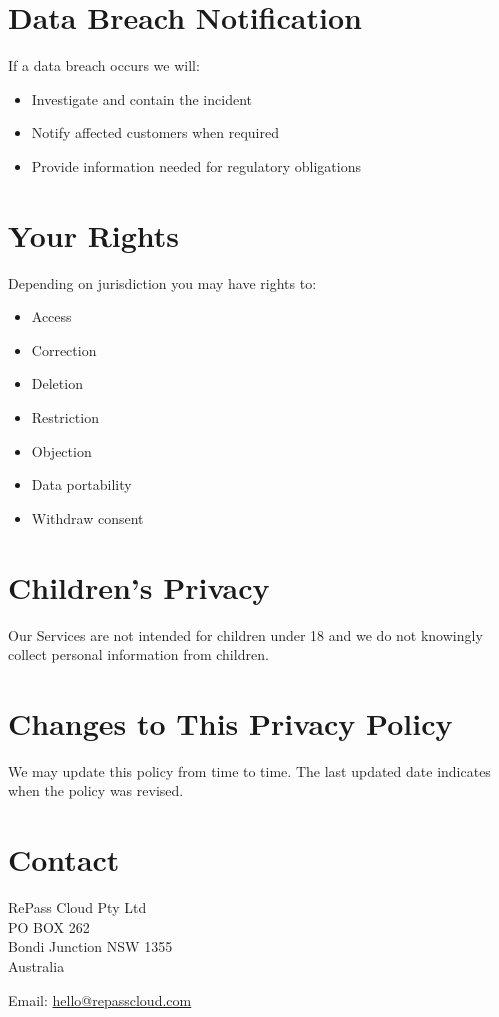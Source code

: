 \documentclass[11pt]{article}
\begin{document}
\section{Data Breach Notification}

If a data breach occurs we will:

\begin{itemize}
\item Investigate and contain the incident
\item Notify affected customers when required
\item Provide information needed for regulatory obligations
\end{itemize}

\section{Your Rights}

Depending on jurisdiction you may have rights to:

\begin{itemize}
\item Access
\item Correction
\item Deletion
\item Restriction
\item Objection
\item Data portability
\item Withdraw consent
\end{itemize}

\section{Children's Privacy}

Our Services are not intended for children under 18 and we do not knowingly collect personal information from children.

\section{Changes to This Privacy Policy}

We may update this policy from time to time. The last updated date indicates when the policy was revised.

\section{Contact}

RePass Cloud Pty Ltd \\
PO BOX 262 \\
Bondi Junction NSW 1355 \\
Australia

Email: \href{mailto:hello@repasscloud.com}{hello@repasscloud.com}
\end{document}
